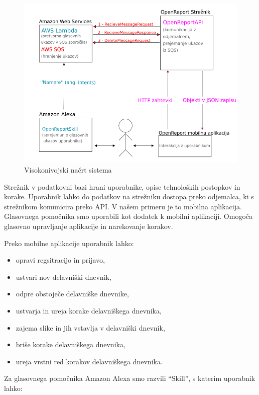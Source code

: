 \documentclass[a4paper, 12pt]{book}
\begin{document}
\begin{figure}[H]
\begin{center}
\includegraphics[width=13cm]{plan}
\end{center}
\caption{Visokonivojski načrt sistema}
\label{plan}
\end{figure}

Strežnik v podatkovni bazi hrani uporabnike, opise tehnoloških postopkov in korake.
Uporabnik lahko do podatkov na strežniku dostopa preko odjemalca, ki s strežnikom komunicira preko API.
V našem primeru je to mobilna aplikacija.
Glasovnega pomočnika smo uporabili kot dodatek k mobilni aplikaciji.
Omogoča glasovno upravljanje aplikacije in narekovanje korakov.

\bigbreak
Preko mobilne aplikacije uporabnik lahko:
\begin{itemize}
	\item opravi regsitracijo in prijavo,
	\item ustvari nov delavniški dnevnik,
	\item odpre obstoječe delavniške dnevnike,
	\item ustvarja in ureja korake delavniškega dnevnika,
	\item zajema slike in jih vstavlja v delavniški dnevnik,
	\item briše korake delavniškega dnevnika,
	\item ureja vrstni red korakov delavniškega dnevnika.
\end{itemize}

Za glasovnega pomočnika Amazon Alexa smo razvili \enquote{Skill}, s katerim uporabnik lahko:
\end{document}
